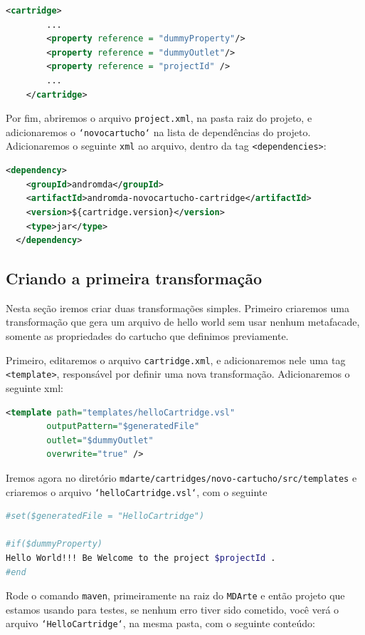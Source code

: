  \begin{lstlisting}[language=xml]
	<cartridge>
		...
	    <property reference = "dummyProperty"/>
	    <property reference = "dummyOutlet"/>
		<property reference = "projectId" />
		...
	</cartridge>
 \end{lstlisting}
 
 Por fim, abriremos o arquivo \texttt{project.xml}, na pasta raiz do projeto, e
 adicionaremos o \texttt{`novocartucho`} na lista de dependências do projeto.
 Adicionaremos o seguinte \texttt{xml} ao arquivo, dentro da tag
 \texttt{<dependencies>}:
 
 \begin{lstlisting}[language=xml]
  <dependency>
  	<groupId>andromda</groupId>
    <artifactId>andromda-novocartucho-cartridge</artifactId>
    <version>${cartridge.version}</version>
    <type>jar</type>
  </dependency>
 \end{lstlisting}
 
 
\subsection{Criando a primeira transformação}
Nesta seção iremos criar duas transformações simples. Primeiro criaremos uma
transformação que gera um arquivo de hello world sem usar nenhum metafacade,
somente as propriedades do cartucho que definimos previamente.

Primeiro, editaremos o arquivo \texttt{cartridge.xml}, e adicionaremos nele uma
tag \texttt{<template>}, responsável por definir uma nova transformação.
Adicionaremos o seguinte xml:

\begin{lstlisting}[language=xml]
	<template path="templates/helloCartridge.vsl"
        outputPattern="$generatedFile"
        outlet="$dummyOutlet"
        overwrite="true" />
\end{lstlisting}

Iremos agora no diretório \texttt{mdarte/cartridges/novo-cartucho/src/templates}
e criaremos o arquivo \texttt{`helloCartridge.vsl`}, com o seguinte 

\begin{lstlisting}[language=bash]
#set($generatedFile = "HelloCartridge")

#if($dummyProperty)
Hello World!!! Be Welcome to the project $projectId .
#end
\end{lstlisting}

Rode o comando \texttt{maven}, primeiramente na raiz do \texttt{MDArte} e então
projeto que estamos usando para testes, se nenhum erro tiver sido cometido, você
verá o arquivo \texttt{`HelloCartridge`}, na mesma pasta, com o seguinte
conteúdo:


